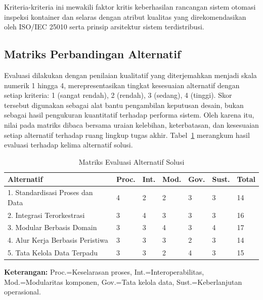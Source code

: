 \FloatBarrier

Kriteria-kriteria ini mewakili faktor kritis keberhasilan rancangan sistem otomasi inspeksi kontainer dan selaras dengan atribut kualitas yang direkomendasikan oleh ISO/IEC 25010 serta prinsip arsitektur sistem terdistribusi.

\subsection{Matriks Perbandingan Alternatif}

Evaluasi dilakukan dengan penilaian kualitatif yang diterjemahkan menjadi skala numerik 1 hingga 4, merepresentasikan tingkat kesesuaian alternatif dengan setiap kriteria: 1 (sangat rendah), 2 (rendah), 3 (sedang), 4 (tinggi). Skor tersebut digunakan sebagai alat bantu pengambilan keputusan desain, bukan sebagai hasil pengukuran kuantitatif terhadap performa sistem. Oleh karena itu, nilai pada matriks dibaca bersama uraian kelebihan, keterbatasan, dan kesesuaian setiap alternatif terhadap ruang lingkup tugas akhir. Tabel~\ref{tbl:evaluasi_alternatif} merangkum hasil evaluasi terhadap kelima alternatif solusi.

\begin{table}[ht]
\centering
\small
\caption{Matriks Evaluasi Alternatif Solusi}
\label{tbl:evaluasi_alternatif}
\begin{tabular}{p{} p{} p{} p{} p{} p{} p{}}
\toprule
\textbf{Alternatif} & \textbf{Proc.} & \textbf{Int.} & \textbf{Mod.} & \textbf{Gov.} & \textbf{Sust.} & \textbf{Total} \\
\midrule
1. Standardisasi Proses dan Data & 4 & 2 & 2 & 3 & 3 & 14 \\
2. Integrasi Terorkestrasi & 3 & 4 & 3 & 3 & 3 & 16 \\
3. Modular Berbasis Domain & 3 & 3 & 4 & 3 & 4 & 17 \\
4. Alur Kerja Berbasis Peristiwa & 3 & 3 & 3 & 2 & 3 & 14 \\
5. Tata Kelola Data Terpadu & 3 & 3 & 2 & 4 & 3 & 15 \\
\bottomrule
\end{tabular}
\end{table}

\FloatBarrier

\textbf{Keterangan:} Proc.=Keselarasan proses, Int.=Interoperabilitas, Mod.=Modularitas komponen, Gov.=Tata kelola data, Sust.=Keberlanjutan operasional.

